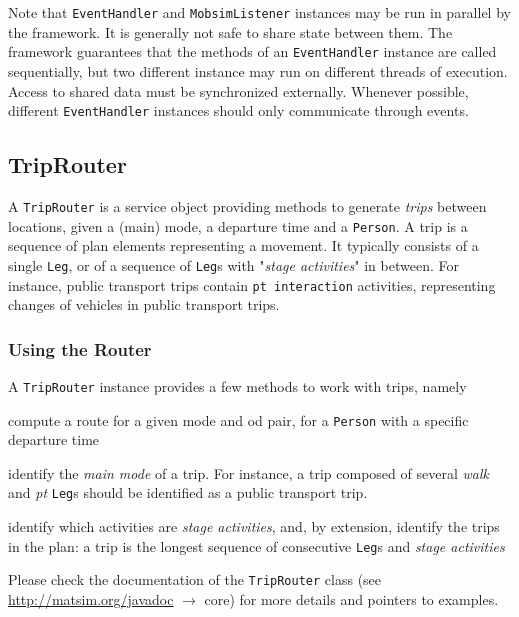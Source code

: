 Note that \lstinline|EventHandler| and \lstinline|MobsimListener| instances may be run in parallel by
the framework. It is generally not safe to share state between them. The framework guarantees that 
the methods of an \lstinline|EventHandler| instance are called sequentially, but two different instance
may run on different threads of execution. Access to shared data must be synchronized externally. Whenever
possible, different \lstinline|EventHandler| instances should only communicate through events.

\subsection{TripRouter}
\label{sec:router-extension-point}
A \lstinline{TripRouter} is a service object providing methods to generate \emph{trips} between locations,
given a (main) mode, a departure time and a \lstinline{Person}.
A trip is a sequence of plan elements representing a movement.
It typically consists of a single \lstinline{Leg},
or of a sequence of \lstinline{Leg}s with "\emph{stage activities}" in between.
For instance, public transport trips
contain \lstinline{pt interaction} activities,
representing changes of vehicles in public transport trips.

\subsubsection{Using the Router}
A \lstinline{TripRouter} instance provides a few methods to work with trips, namely
\begin{compactitem}
	\item compute a route for a given mode and \gls{od} pair, for a \lstinline{Person} with a specific departure time
	\item identify the \emph{main mode} of a trip. For instance, a trip composed of several \emph{walk} and \emph{pt} \lstinline{Leg}s should be identified as a public transport trip.
	\item identify which activities are \emph{stage activities}, and, by extension,
		identify the trips in the plan: a trip is the longest sequence of consecutive
		\lstinline{Leg}s and \emph{stage activities}
\end{compactitem}

Please check the documentation of the \lstinline{TripRouter} class  (see \url{http://matsim.org/javadoc} $\to$ core) for more details and pointers to examples.

